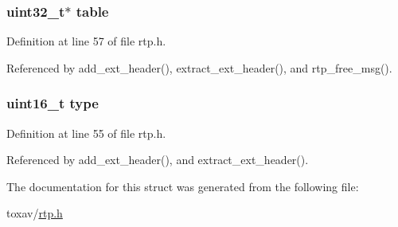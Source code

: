 \hypertarget{struct___r_t_p_ext_header_a05be6af94bcc30c135e4b6089bf9cfd9}{
\subsubsection[{table}]{\setlength{\rightskip}{0pt plus 5cm}uint32\+\_\+t$\ast$ table}}\label{struct___r_t_p_ext_header_a05be6af94bcc30c135e4b6089bf9cfd9}


Definition at line 57 of file rtp.\+h.



Referenced by add\+\_\+ext\+\_\+header(), extract\+\_\+ext\+\_\+header(), and rtp\+\_\+free\+\_\+msg().

\hypertarget{struct___r_t_p_ext_header_acb5cfd209ba75c853d03f701e7f91679}{
\subsubsection[{type}]{\setlength{\rightskip}{0pt plus 5cm}uint16\+\_\+t type}}\label{struct___r_t_p_ext_header_acb5cfd209ba75c853d03f701e7f91679}


Definition at line 55 of file rtp.\+h.



Referenced by add\+\_\+ext\+\_\+header(), and extract\+\_\+ext\+\_\+header().



The documentation for this struct was generated from the following file\+:\begin{DoxyCompactItemize}
\item 
toxav/\hyperlink{rtp_8h}{rtp.\+h}\end{DoxyCompactItemize}
